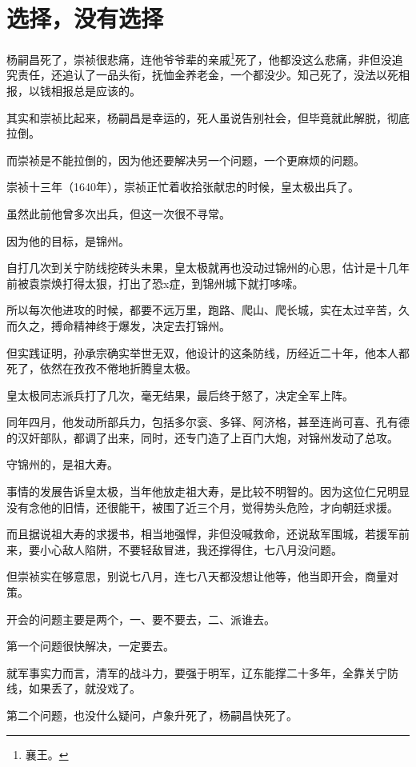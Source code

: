 \section{选择，没有选择}
\ifnum{}
	\begin{multicols}{\theparacolNo}
\fi
杨嗣昌死了，崇祯很悲痛，连他爷爷辈的亲戚\footnote{襄王。}死了，他都没这么悲痛，非但没追究责任，还追认了一品头衔，抚恤金养老金，一个都没少。知己死了，没法以死相报，以钱相报总是应该的。

其实和崇祯比起来，杨嗣昌是幸运的，死人虽说告别社会，但毕竟就此解脱，彻底拉倒。

而崇祯是不能拉倒的，因为他还要解决另一个问题，一个更麻烦的问题。

崇祯十三年（1640年），崇祯正忙着收拾张献忠的时候，皇太极出兵了。

虽然此前他曾多次出兵，但这一次很不寻常。

因为他的目标，是锦州。

自打几次到关宁防线挖砖头未果，皇太极就再也没动过锦州的心思，估计是十几年前被袁崇焕打得太狠，打出了恐x症，到锦州城下就打哆嗦。

所以每次他进攻的时候，都要不远万里，跑路、爬山、爬长城，实在太过辛苦，久而久之，搏命精神终于爆发，决定去打锦州。

但实践证明，孙承宗确实举世无双，他设计的这条防线，历经近二十年，他本人都死了，依然在孜孜不倦地折腾皇太极。

皇太极同志派兵打了几次，毫无结果，最后终于怒了，决定全军上阵。

同年四月，他发动所部兵力，包括多尔衮、多铎、阿济格，甚至连尚可喜、孔有德的汉奸部队，都调了出来，同时，还专门造了上百门大炮，对锦州发动了总攻。

守锦州的，是祖大寿。

事情的发展告诉皇太极，当年他放走祖大寿，是比较不明智的。因为这位仁兄明显没有念他的旧情，还很能干，被围了近三个月，觉得势头危险，才向朝廷求援。

而且据说祖大寿的求援书，相当地强悍，非但没喊救命，还说敌军围城，若援军前来，要小心敌人陷阱，不要轻敌冒进，我还撑得住，七八月没问题。

但崇祯实在够意思，别说七八月，连七八天都没想让他等，他当即开会，商量对策。

开会的问题主要是两个，一、要不要去，二、派谁去。

第一个问题很快解决，一定要去。

就军事实力而言，清军的战斗力，要强于明军，辽东能撑二十多年，全靠关宁防线，如果丢了，就没戏了。

第二个问题，也没什么疑问，卢象升死了，杨嗣昌快死了。


\end{multicols}
